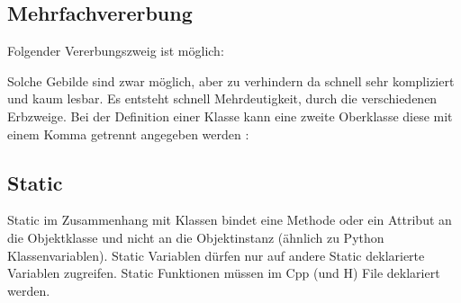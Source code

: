 \subsection{Mehrfachvererbung}

Folgender Vererbungszweig ist möglich:\\
\noindent
\begin{minipage}{0.5\columnwidth}
    \begin{center}
    \end{center}  
\end{minipage}
\begin{minipage}{0.5\columnwidth}
Solche Gebilde sind zwar möglich, aber zu verhindern da schnell sehr kompliziert und kaum lesbar. 
Es entsteht schnell Mehrdeutigkeit, durch die verschiedenen Erbzweige. 
Bei der Definition einer Klasse kann eine zweite Oberklasse diese mit einem Komma getrennt angegeben werden :

\end{minipage}



\subsection{Static} 

Static im Zusammenhang mit Klassen bindet eine Methode oder ein Attribut an die Objektklasse und nicht an die Objektinstanz (ähnlich zu Python Klassenvariablen).
Static Variablen dürfen nur auf andere Static deklarierte Variablen zugreifen. 
Static Funktionen müssen im Cpp (und H) File deklariert werden.
